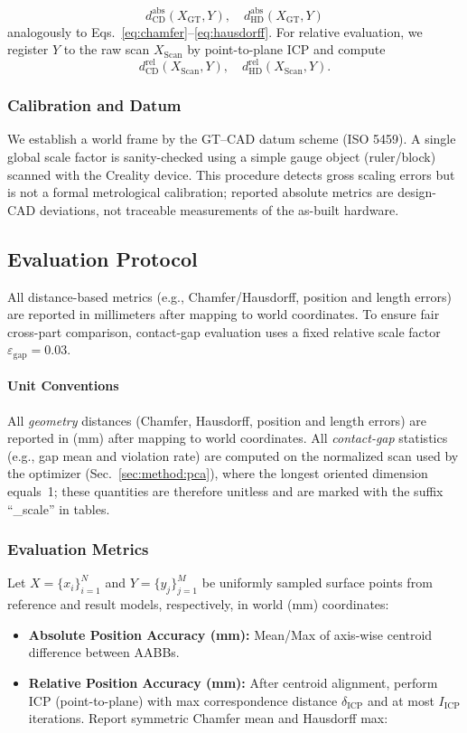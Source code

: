 \documentclass{ieeeaccess}
\begin{document}
\[
d_{\mathrm{CD}}^{\mathrm{abs}}(X_{\mathrm{GT}},Y),\quad
d_{\mathrm{HD}}^{\mathrm{abs}}(X_{\mathrm{GT}},Y)
\]
analogously to Eqs.~\eqref{eq:chamfer}–\eqref{eq:hausdorff}.
For relative evaluation, we register $Y$ to the raw scan $X_{\mathrm{Scan}}$ by point-to-plane ICP and compute
\[
d_{\mathrm{CD}}^{\mathrm{rel}}(X_{\mathrm{Scan}},Y),\quad
d_{\mathrm{HD}}^{\mathrm{rel}}(X_{\mathrm{Scan}},Y).
\]


\subsubsection{Calibration and Datum}
\label{sec:calibration}
We establish a world frame by the GT--CAD datum scheme (ISO 5459). A single global scale factor is sanity-checked using a simple gauge object (ruler/block) scanned with the Creality device. This procedure detects gross scaling errors but is not a formal metrological calibration; reported absolute metrics are design-CAD deviations, not traceable measurements of the as-built hardware.


\subsection{Evaluation Protocol}
All distance-based metrics (e.g., Chamfer/Hausdorff, position and length errors)
are reported in millimeters after mapping to world coordinates. To ensure fair
cross-part comparison, contact-gap evaluation uses a fixed relative scale factor
$\varepsilon_{\mathrm{gap}} = 0.03$.

\paragraph*{Unit Conventions}
\label{sec:unit_conventions}
All \emph{geometry} distances (Chamfer, Hausdorff, position and length errors) are reported in (mm) after mapping to world coordinates.
All \emph{contact-gap} statistics (e.g., gap mean and violation rate) are computed on the
normalized scan used by the optimizer (Sec.~\ref{sec:method:pca}), where the longest oriented
dimension equals~1; these quantities are therefore unitless and are marked with the suffix
``\_scale'' in tables.


\subsubsection{Evaluation Metrics}
Let \(X=\{x_i\}_{i=1}^{N}\) and \(Y=\{y_j\}_{j=1}^{M}\) be uniformly sampled surface points from reference and result models, respectively, in world (mm) coordinates:
\begin{itemize}
  \item \textbf{Absolute Position Accuracy (mm):} Mean/Max of axis-wise centroid difference between AABBs.
  \item \textbf{Relative Position Accuracy (mm):} After centroid alignment, perform ICP (point-to-plane) with max correspondence distance \(\delta_{\mathrm{ICP}}\) and at most \(I_{\mathrm{ICP}}\) iterations. Report symmetric Chamfer mean and Hausdorff max:
\end{itemize}
\end{document}
